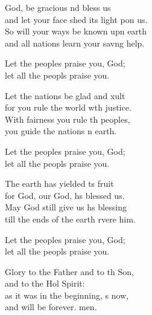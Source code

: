 \settowidth{\versewidth}{and let your face shed its light upon us.}
\begin{psalmverse}%
  \begin{patverse}
 God, be gracious nd bless us\Med\\
and let your face shed its light pon us.\\
So will your ways be known upn earth\Med\\
and all nations learn your sav\pointup{\i}ng help.

Let the peoples praise you,  God;\Med\\
let all the peopls praise you.

Let the nations be glad and xult\Med\\
for you rule the world w\pointup{\i}th justice.\\
With fairness you rule th peoples,\Med\\
you guide the nations n earth.

Let the peoples praise you,  God;\Med\\
let all the peopls praise you.

The earth has yielded \pointup{\i}ts fruit\Med\\
for God, our God, hs blessed us.\\
May God still give us h\pointup{\i}s blessing\Med\\
till the ends of the earth rvere him.

Let the peoples praise you,  God;\Med\\
let all the peopls praise you.

Glory to the Father and to th Son,\Med\\
and to the Hol Spirit:\\
as it was in the beginning, \pointup{\i}s now,\Med\\
and will be forever. men.
  \end{patverse}
\end{psalmverse}
